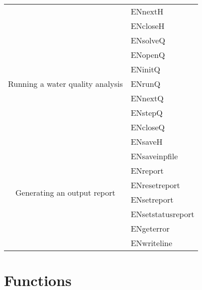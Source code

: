 \begin{longtable}{|c| l|}
&ENnextH\\
&ENcloseH\\
\hline
\multirow{7}{*}{Running a water quality analysis}
&ENsolveQ\\
&ENopenQ\\
&ENinitQ\\
&ENrunQ\\
&ENnextQ\\
&ENstepQ\\
&ENcloseQ\\
\hline
\multirow{8}{*}{Generating an output report}
&ENsaveH\\
&ENsaveinpfile\\
&ENreport\\
&ENresetreport\\
&ENsetreport\\
&ENsetstatusreport\\
&ENgeterror\\
&ENwriteline\\
\hline
\end{longtable}

\section{Functions}



